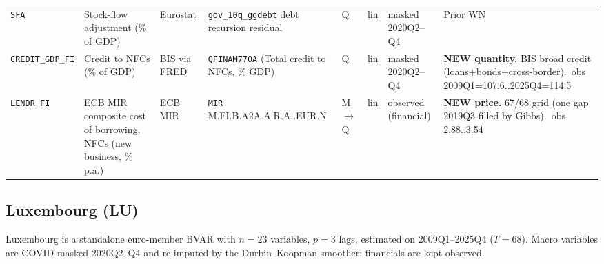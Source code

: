 {\begin{longtable}{@{}p{1.9cm}p{2.9cm}p{1.5cm}p{2.7cm}p{0.7cm}p{1.0cm}p{1.6cm}p{2.4cm}@{}}
\texttt{SFA}          & Stock-flow adjustment (\% of GDP) & Eurostat & \texttt{gov\_10q\_ggdebt} debt recursion residual      & Q & lin & masked 2020Q2--Q4 & Prior WN \\
\texttt{CREDIT\_GDP\_FI} & Credit to NFCs (\% of GDP)     & BIS via FRED & \texttt{QFINAM770A} (Total credit to NFCs, \% GDP)    & Q & lin & masked 2020Q2--Q4 & \textbf{NEW quantity.} BIS broad credit (loans+bonds+cross-border).\ obs 2009Q1=107.6..2025Q4=114.5 \\
\texttt{LENDR\_FI}    & ECB MIR composite cost of borrowing, NFCs (new business, \% p.a.) & ECB MIR & \texttt{MIR} M.\allowbreak FI.\allowbreak B.\allowbreak A2A.\allowbreak A.\allowbreak R.\allowbreak A.\allowbreak 2240.\allowbreak EUR.\allowbreak N & M$\to$Q & lin & observed (financial) & \textbf{NEW price.} 67/68 grid (one gap 2019Q3 filled by Gibbs).\ obs 2.88..3.54 \\
\end{longtable}}

\subsection{Luxembourg (LU)}\label{sec:data:LU}
Luxembourg is a standalone euro-member BVAR with $n=23$ variables,
$p=3$ lags, estimated on 2009Q1--2025Q4 ($T=68$).  Macro variables are
COVID-masked 2020Q2--Q4 and re-imputed by the Durbin--Koopman smoother;
financials are kept observed.

